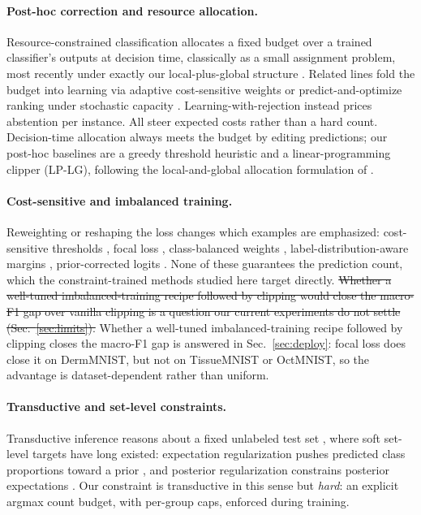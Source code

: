\documentclass[10pt]{article}
\newcommand{\del}[1]{{\color{red}\sout{#1}}}
\begin{document}
\paragraph{Post-hoc correction and resource allocation.}
Resource-constrained classification allocates a fixed budget over a trained
classifier's outputs at decision time, classically as a small assignment
problem, most recently under exactly our local-plus-global structure
\citep{shifman2025classification}. Related lines fold the budget into learning via adaptive cost-sensitive
weights \citep{shifman2023adaptive} or predict-and-optimize ranking
under stochastic capacity \citep{vanderschueren2024new}.
Learning-with-rejection \citep{cortes2016learning} instead prices
abstention per instance. All steer expected costs rather than a hard
count. Decision-time allocation always
meets the budget by editing predictions; our post-hoc baselines are a greedy
threshold heuristic and a linear-programming clipper (LP-LG), following
the local-and-global allocation formulation of
\citet{shifman2025classification}.

\paragraph{Cost-sensitive and imbalanced training.}
Reweighting or reshaping the loss changes which examples are emphasized:
cost-sensitive thresholds \citep{elkan2001foundations}, focal loss
\citep{lin2017focal}, class-balanced weights \citep{cui2019class},
label-distribution-aware margins \citep{cao2019learning}, prior-corrected
logits \citep{menon2020long}. None of these guarantees the prediction count, which the
constraint-trained methods studied here target directly. \del{Whether a
well-tuned imbalanced-training recipe followed by clipping would close
the macro-F1 gap over vanilla clipping is a question our current
experiments do not settle \mbox{(Sec.~\ref{sec:limits})}.}
{\color{blue}Whether a well-tuned imbalanced-training recipe followed by
clipping closes the macro-F1 gap is answered in Sec.~\ref{sec:deploy}: focal
loss does close it on DermMNIST, but not on TissueMNIST or OctMNIST, so the
advantage is dataset-dependent rather than uniform.}

\paragraph{Transductive and set-level constraints.}
Transductive inference reasons about a fixed unlabeled test set
\citep{vapnik1998statistical,joachims1999transductive}, where soft set-level
targets have long existed: expectation regularization pushes predicted class
proportions toward a prior \citep{mann2007simple}, and posterior
regularization constrains posterior expectations \citep{ganchev2009posterior}.
Our constraint is transductive in this sense but \emph{hard}: an explicit
argmax count budget, with per-group caps, enforced during training.
\end{document}
